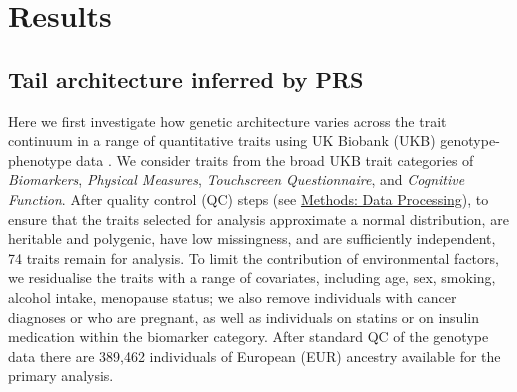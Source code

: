 \documentclass[12pt]{zHenriquesLab-StyleBioRxiv}
\begin{document}
\section*{Results} \label{sec:results} 
\subsection*{Tail architecture inferred by PRS} 
Here we first investigate how genetic architecture 
varies across the trait continuum in a range of 
quantitative traits using UK Biobank (UKB) 
genotype-phenotype data \cite{Bycroft2018}. We consider traits 
from the broad UKB trait categories of \emph{Biomarkers}, 
\emph{Physical Measures}, \emph{Touchscreen Questionnaire}, and \emph{Cognitive Function}. 
After quality control (QC) steps (see \hyperref[sec:methods:dataProcessing]{Methods: Data Processing}),
to ensure that the traits selected for analysis approximate a normal 
distribution, are heritable and polygenic, have low missingness, 
and are sufficiently independent, 74 traits remain for analysis. 
To limit the contribution of environmental factors, we 
residualise the traits with a range of covariates, including 
age, sex, smoking, alcohol intake, menopause status; 
we also remove individuals with cancer diagnoses or who 
are pregnant, as well as individuals on statins or on 
insulin medication within the biomarker category. 
After standard QC of the genotype data
there are 389,462 individuals of European (EUR)
ancestry available for the primary analysis.
\end{document}
